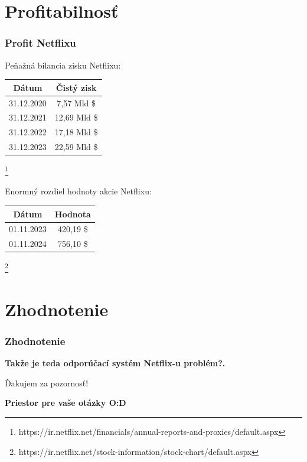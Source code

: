\documentclass{beamer}
\newcommand{\footcite}[1]{\footnote{\tiny #1}}
\begin{document}
\section{Profitabilnosť}

\begin{frame}[fragile=singleslide]\frametitle{Profit Netflixu}


    \begin{center}
        Peňažná bilancia zisku Netflixu:
        \vspace{0.2cm}

        \begin{tabular}{||c | c||}
            \hline
            Dátum      & Čistý zisk   \\ [0.5ex]
            \hline\hline
            31.12.2020 & 7,57 Mld \$  \\
            \hline
            31.12.2021 & 12,69 Mld \$ \\
            \hline
            31.12.2022 & 17,18 Mld \$ \\
            \hline
            31.12.2023 & 22,59 Mld \$ \\
            \hline
        \end{tabular}
        \footcite{https://ir.netflix.net/financials/annual-reports-and-proxies/default.aspx}

        \vspace{0.4cm}
        Enormný rozdiel hodnoty akcie Netflixu:

        \begin{tabular}{|c | c|}
            \hline
            Dátum      & Hodnota    \\ [0.5ex]
            \hline\hline
            01.11.2023 & 420,19  \$ \\
            \hline
            01.11.2024 & 756,10 \$  \\
            \hline
        \end{tabular}
        \footcite{https://ir.netflix.net/stock-information/stock-chart/default.aspx}
    \end{center}
\end{frame}


\section*{Zhodnotenie}

\begin{frame}[fragile=singleslide]\frametitle{Zhodnotenie}

    \textbf{Takže je teda odporúčací systém Netflix-u problém?.}

    \vspace{1cm}
    Ďakujem za pozornosť!

    \textbf{Priestor pre vaše otázky O:D}
\end{frame}
\end{document}
